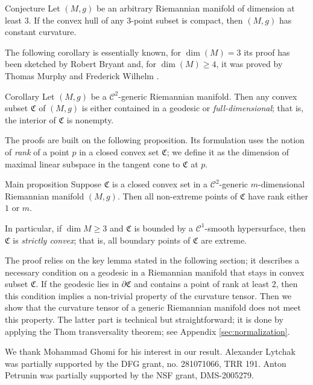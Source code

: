\documentclass[a4paper,10pt]{article}
\begin{document}
\begin{thm}{Conjecture}  Let $(M,g)$ be an arbitrary Riemannian manifold of dimension at least 3.
If the convex hull of any 3-point subset is compact,
then $(M,g)$ has constant curvature.
\end{thm}

The following corollary is essentially known, for $\dim (M)=3$ its proof has been sketched by Robert Bryant \cite{Bryant} and, for $\dim (M)\geq 4$, it was proved by Thomas Murphy and Frederick Wilhelm \cite{Wilhelm}.

\begin{thm}{Corollary}\label{cor:main}
Let $(M,g)$ be a $\mathcal C^2$-generic Riemannian manifold.
Then any convex subset $\mathfrak C$ of $(M,g)$ is either contained in a geodesic
or \emph{full-dimensional}; that is, the interior of $\mathfrak C$ is nonempty.
\end{thm}

The proofs are built on the following proposition.
Its formulation uses the notion of \emph{rank} of a point $p$ in a closed convex set $\mathfrak{C}$;
we define it as the dimension of maximal linear subspace in the tangent cone to $\mathfrak{C}$ at $p$.

\begin{thm}{Main proposition}\label{prom:rank}
Suppose $\mathfrak{C}$ is a closed convex set in a $\mathcal C^2$-generic $m$-dimensional Riemannian manifold $(M,g)$.
Then all non-extreme points of $\mathfrak{C}$ have rank either $1$ or $m$.

In particular, if $\dim M\ge 3$ and $\mathfrak{C}$ is bounded by a $\mathcal{C}^1$-smooth hypersurface, then $\mathfrak{C}$ is \emph{strictly convex};
that is, all boundary points of $\mathfrak{C}$ are extreme.
\end{thm}


The proof relies on the key lemma stated in the following section;   
it describes a necessary condition on a geodesic in a Riemannian manifold that stays
in convex subset $\mathfrak C$.
If the geodesic  lies in $\partial \mathfrak C$ and  contains a point of rank at least 2, then this condition implies a non-trivial
property  of the curvature tensor.
Then we show that the curvature tensor of a generic Riemannian manifold does not meet this property.
The latter part is technical but straightforward; it is done by applying the Thom transversality theorem; see Appendix \ref{sec:normalization}.


We thank Mohammad Ghomi for his interest in our result.
Alexander Lytchak was partially supported by the DFG grant, no. 281071066, TRR 191.
Anton Petrunin was partially supported by the NSF grant, DMS-2005279.
\end{document}
